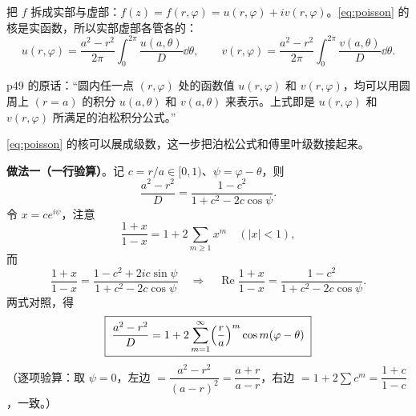 \documentclass[11pt]{ctexart}
\let\origsubhdr\subhdr
\renewcommand{\subhdr}[1]{\par\needspace{4\baselineskip}\origsubhdr{#1}}
\begin{document}



把 $f$ 拆成实部与虚部：$f(z)=f(r,\varphi)=u(r,\varphi)+iv(r,\varphi)$。\eqref{eq:poisson} 的核是实函数，所以实部虚部各管各的：
\begin{equation}\label{eq:poissonuv}
u(r,\varphi)=\frac{a^{2}-r^{2}}{2\pi}\int_0^{2\pi}\frac{u(a,\theta)}{D}\dd\theta,
\qquad
v(r,\varphi)=\frac{a^{2}-r^{2}}{2\pi}\int_0^{2\pi}\frac{v(a,\theta)}{D}\dd\theta .
\end{equation}

p49 的原话：“圆内任一点 $(r,\varphi)$ 处的函数值 $u(r,\varphi)$ 和 $v(r,\varphi)$，均可以用圆周上 $(r=a)$ 的积分 $u(a,\theta)$ 和 $v(a,\theta)$ 来表示。上式即是 $u(r,\varphi)$ 和 $v(r,\varphi)$ 所满足的泊松积分公式。”



\eqref{eq:poisson} 的核可以展成级数，这一步把泊松公式和傅里叶级数接起来。

\textbf{做法一（一行验算）}。记 $c=r/a\in[0,1)$、$\psi=\varphi-\theta$，则
\[ \frac{a^{2}-r^{2}}{D}=\frac{1-c^{2}}{1+c^{2}-2c\cos\psi} . \]
令 $x=ce^{i\psi}$，注意
\[ \frac{1+x}{1-x}=1+2\sum_{m\ge1}x^{m}\quad(|x|<1), \]
而
\[ \frac{1+x}{1-x}=\frac{1-c^{2}+2ic\sin\psi}{1+c^{2}-2c\cos\psi}
\quad\Longrightarrow\quad
\operatorname{Re}\frac{1+x}{1-x}=\frac{1-c^{2}}{1+c^{2}-2c\cos\psi} . \]
两式对照，得
\begin{equation}\label{eq:kernel}
\boxed{\;\frac{a^{2}-r^{2}}{D}=1+2\sum_{m=1}^{\infty}\Bigl(\frac{r}{a}\Bigr)^{m}\cos m(\varphi-\theta)\;}
\end{equation}
（逐项验算：取 $\psi=0$，左边 $=\dfrac{a^{2}-r^{2}}{(a-r)^{2}}=\dfrac{a+r}{a-r}$，右边 $=1+2\sum c^{m}=\dfrac{1+c}{1-c}$，一致。）
\end{document}
